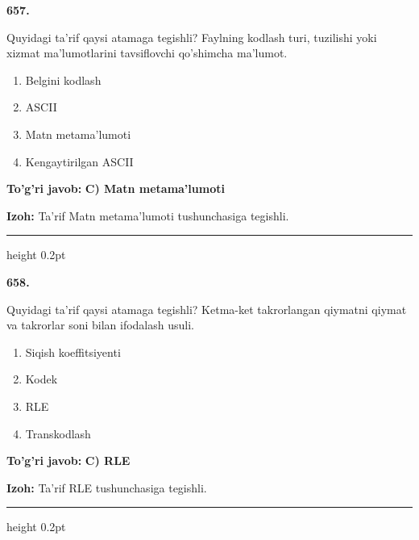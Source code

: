 \documentclass[10pt,a4paper,oneside]{article}
\begin{document}
\noindent\textbf{\color{ink}657.}
\par
Quyidagi ta'rif qaysi atamaga tegishli? Faylning kodlash turi, tuzilishi yoki xizmat ma'lumotlarini tavsiflovchi qo'shimcha ma'lumot.
\begin{enumerate}[label=\Alph*),leftmargin=9mm]
\item Belgini kodlash
\item ASCII
\item Matn metama'lumoti
\item Kengaytirilgan ASCII
\end{enumerate}
\begin{tcolorbox}[enhanced,breakable,colback=teal!4,colframe=teal!50!black,boxrule=0.5pt,arc=1.1mm,left=3mm,right=3mm,top=1.7mm,bottom=1.7mm,before skip=2mm,after skip=2mm]
\textbf{\color{teal}To'g'ri javob:} \textbf{C) Matn metama'lumoti}
\par\smallskip
\textbf{Izoh:} Ta'rif Matn metama'lumoti tushunchasiga tegishli.
\end{tcolorbox}
\vspace{2mm}\hrule height 0.2pt \vspace{3mm}

\noindent\textbf{\color{ink}658.}
\par
Quyidagi ta'rif qaysi atamaga tegishli? Ketma-ket takrorlangan qiymatni qiymat va takrorlar soni bilan ifodalash usuli.
\begin{enumerate}[label=\Alph*),leftmargin=9mm]
\item Siqish koeffitsiyenti
\item Kodek
\item RLE
\item Transkodlash
\end{enumerate}
\begin{tcolorbox}[enhanced,breakable,colback=teal!4,colframe=teal!50!black,boxrule=0.5pt,arc=1.1mm,left=3mm,right=3mm,top=1.7mm,bottom=1.7mm,before skip=2mm,after skip=2mm]
\textbf{\color{teal}To'g'ri javob:} \textbf{C) RLE}
\par\smallskip
\textbf{Izoh:} Ta'rif RLE tushunchasiga tegishli.
\end{tcolorbox}
\vspace{2mm}\hrule height 0.2pt \vspace{3mm}
\end{document}
